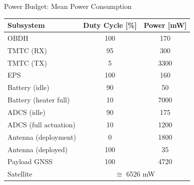\begin{frame}{Power Budget: Mean Power Consumption}

    \begin{table}[!ht]\scriptsize
        \centering
        \begin{tabular}{lcc}
            \toprule[1.5pt]
            \textbf{Subsystem} & \textbf{Duty Cycle [\%]} & \textbf{Power [mW]} \\
            \midrule
            OBDH                  & 100 & 170 \\
            TMTC (RX)             & 95  & 300 \\
            TMTC (TX)             & 5   & 3300 \\
            EPS                   & 100 & 160 \\
            Battery (idle)        & 90  & 50 \\
            Battery (heater full) & 10  & 7000 \\
            ADCS (idle)           & 90  & 175 \\
            ADCS (full actuation) & 10  & 1200 \\
            Antenna (deployment)  & 0   & 1800 \\
            Antenna (deployed)    & 100 & 35 \\
            Payload GNSS          & 100 & 4720 \\
            \cmidrule{2-3}
            Satellite             & \multicolumn{2}{c}{$\cong$ 6526 mW} \\
            \bottomrule[1.5pt]
        \end{tabular}
        \label{tab:power-duty-cycle}
    \end{table}

\end{frame}

